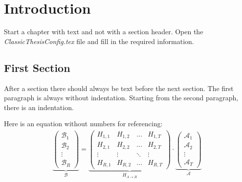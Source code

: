 
\chapter{Introduction}\label{ch:introduction}
\glsresetall %

Start a chapter with text and not with a section header.
Open the \emph{ClassicThesisConfig.tex} file and fill in the required information.

\section{First Section}
\label{sec:firstsection}

After a section there should always be text before the next section.
The first paragraph is always without indentation.
Starting from the second paragraph, there is an indentation.

Here is an equation without numbers for referencing:
\begin{align*}
	\underbrace{
		\begin{pmatrix}
			\mathcal{B}_1 \\
			\mathcal{B}_2 \\
			\vdots        \\
			\mathcal{B}_R
		\end{pmatrix}
	}_{\mathcal{B}}
	= \underbrace{
		\begin{pmatrix}
			H_{1,1} & H_{1,2} & \hdots & H_{1,T} \\
			H_{2,1} & H_{2,2} & \hdots & H_{2,T} \\
			\vdots  & \vdots  & \ddots & \vdots  \\
			H_{R,1} & H_{R,2} & \hdots & H_{R,T}
		\end{pmatrix}
	}_{H_{A\rightarrow B}}
	\cdot  \underbrace{
		\begin{pmatrix}
			\mathcal{A}_1 \\
			\mathcal{A}_2 \\
			\vdots        \\
			\mathcal{A}_T
		\end{pmatrix}}_{\mathcal{A}}
\end{align*}

